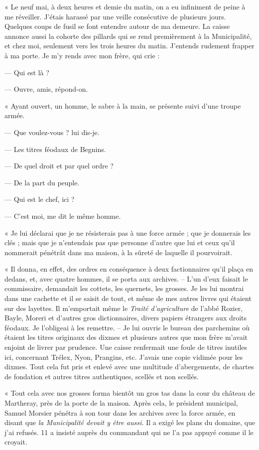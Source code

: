 \documentclass[french,twoside]{book} %
\newenvironment{quoteblock}%
  {\begin{quoting}}
  {\end{quoting}}
\newenvironment{quotebar}{%
    \def\FrameCommand{{\color{rubric!10!}\vrule width 0.5em} \hspace{0.9em}}%
    \def\OuterFrameSep{\itemsep} %
    \MakeFramed {\advance\hsize-\width \FrameRestore}
  }%
  {%
    \endMakeFramed
  }
\renewenvironment{quoteblock}%
  {%
    \savenotes
    \setstretch{0.9}
    \begin{quotebar}
  }
  {%
    \end{quotebar}
    \spewnotes
  }
\begin{document}
\begin{quoteblock}
 \noindent « Le neuf mai, à deux heures et demie du matin, on a eu infiniment de peine à me réveiller. J’étais harassé par une veille consécutive de plusieurs jours. Quelques coups de fusil se font entendre autour de ma demeure. La caisse annonce aussi la cohorte des pillards qui se rend premièrement à la Municipalité, et chez moi, seulement vers les trois heures du matin. J’entends rudement frapper à ma porte. Je m’y rends avec mon frère, qui crie :\par
 — Qui est là ?\par
 — Ouvre, amis, répond-on.\par
 « Ayant ouvert, un homme, le sabre à la main, se présente suivi d’une troupe armée.\par
 — Que voulez-vous ? lui dis-je.\par
 — Les titres féodaux de Begnins.\par
 — De quel droit et par quel ordre ?\par
 — De la part du peuple.\par
 — Qui est le chef, ici ?\par
 — C’est moi, me dit le même homme.\par
 « Je lui déclarai que je ne résisterais pas à une force armée ; que je donnerais les clés ; mais que je n’entendais pas que personne d’autre que lui et ceux qu’il nommerait pénétrât dans ma maison, à la sûreté de laquelle il pourvoirait.\par
 « Il donna, en effet, des ordres en conséquence à deux factionnaires qu’il plaça en dedans, et, avec quatre hommes, il se porta aux archives. – L’un d’eux faisait le commissaire, demandait les cottets, les quernets, les grosses. Je les lui montrai dans une cachette et il se saisit de tout, et même de mes autres livres qui étaient sur des layettes. Il m’emportait même le \emph{Traité d’agriculture} de l’abbé Rozier, Bayle, Moreri et d’autres gros dictionnaires, divers papiers étrangers aux droits féodaux. Je l’obligeai à les remettre. – Je lui ouvris le bureau des parchemins où étaient les titres originaux des dixmes et plusieurs autres que mon frère m’avait enjoint de livrer par prudence. Une caisse renfermait une foule de titres inutiles ici, concernant Trélex, Nyon, Prangins, etc. J’avais une copie vidimée pour les dixmes. Tout cela fut pris et enlevé avec une multitude d’abergements, de chartes de fondation et autres titres authentiques, scellés et non scellés.\par
 « Tout cela avec nos grosses forma bientôt un gros tas dans la cour du château de Martheray, près de la porte de la maison. Après cela, le président municipal, Samuel Morsier pénétra à son tour dans les archives avec la force armée, en disant que \emph{la Municipalité devait y être aussi.} Il a exigé les plans du domaine, que j’ai refusés. 11 a insisté auprès du commandant qui ne l’a pas appuyé comme il le croyait.\par

\end{quoteblock}
\end{document}
